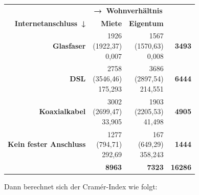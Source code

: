 \documentclass[
  11pt,
  ngerman,
  a4paper,
]{report}
\begin{document}
\begin{table}[H]
\centering
\begin{tabular}{>{}r|r>{}r|>{}r}
\toprule
\multicolumn{1}{c}{\textbf{ }} & \multicolumn{2}{c}{\textbf{→ Wohnverhältnis}} & \multicolumn{1}{c}{\textbf{ }} \\
\cmidrule(l{3pt}r{3pt}){2-3}
\textbf{Internetanschluss ↓} & \textbf{Miete} & \textbf{Eigentum} & \textbf{  }\\
\midrule
\textbf{Glasfaser} & \makecell[tr]{1926\\(1922,37)\\\textcolor{goethe_blue}{0,007}} & \makecell[tr]{1567\\(1570,63)\\\textcolor{goethe_blue}{0,008}} & \textbf{3493}\\
\textbf{DSL} & \makecell[tr]{2758\\(3546,46)\\\textcolor{goethe_blue}{175,293}} & \makecell[tr]{3686\\(2897,54)\\\textcolor{goethe_blue}{214,551}} & \textbf{6444}\\
\textbf{Koaxialkabel} & \makecell[tr]{3002\\(2699,47)\\\textcolor{goethe_blue}{33,905}} & \makecell[tr]{1903\\(2205,53)\\\textcolor{goethe_blue}{41,498}} & \textbf{4905}\\
\textbf{Kein fester Anschluss} & \makecell[tr]{1277\\(794,71)\\\textcolor{goethe_blue}{292,69}} & \makecell[tr]{167\\(649,29)\\\textcolor{goethe_blue}{358,243}} & \textbf{1444}\\
\midrule
\textbf{\textbf{}} & \textbf{8963} & \textbf{7323} & \textbf{\textbf{16286}}\\
\bottomrule
\end{tabular}
\end{table}

Dann berechnet sich der Cramér-Index wie folgt:
\end{document}
